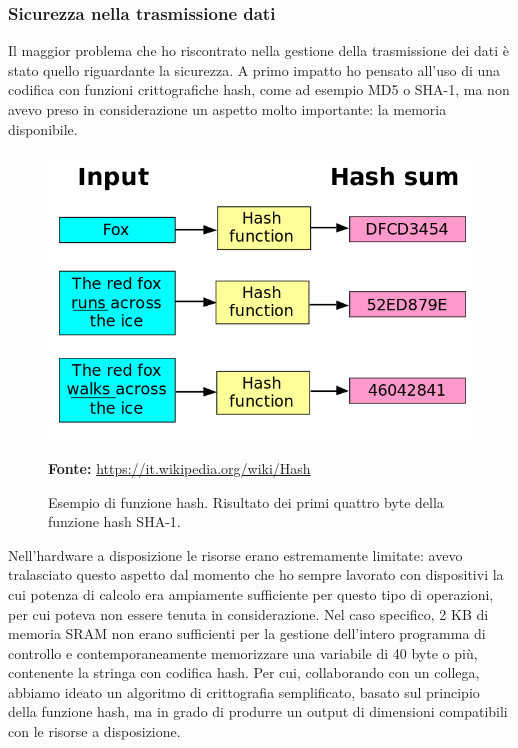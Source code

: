 \subsubsection{Sicurezza nella trasmissione dati}
Il maggior problema che ho riscontrato nella gestione della trasmissione dei dati è stato quello riguardante la sicurezza. A primo impatto ho pensato all'uso di una codifica con funzioni crittografiche hash, come ad esempio MD5 o SHA-1, ma non avevo preso in considerazione un aspetto molto importante: la memoria disponibile. 

\begin{figure}[H]
	\begin{center}
	\includegraphics[scale=0.4]{immagini/hash.png}
	\caption{Esempio di funzione hash. Risultato dei primi quattro byte della funzione hash SHA-1.}
	\small{\textbf{Fonte:} \url{https://it.wikipedia.org/wiki/Hash}}
	\end{center}
\end{figure}

Nell'hardware a disposizione le risorse erano estremamente limitate: avevo tralasciato questo aspetto dal momento che ho sempre lavorato con dispositivi la cui potenza di calcolo era ampiamente sufficiente per questo tipo di operazioni, per cui poteva non essere tenuta in considerazione. Nel caso specifico, 2 KB di memoria SRAM non erano sufficienti per la gestione dell'intero programma di controllo e contemporaneamente memorizzare una variabile di 40 byte o più, contenente la stringa con codifica hash. Per cui, collaborando con un collega, abbiamo ideato un algoritmo di crittografia semplificato, basato sul principio della funzione hash, ma in grado di produrre un output di dimensioni compatibili con le risorse a disposizione.



